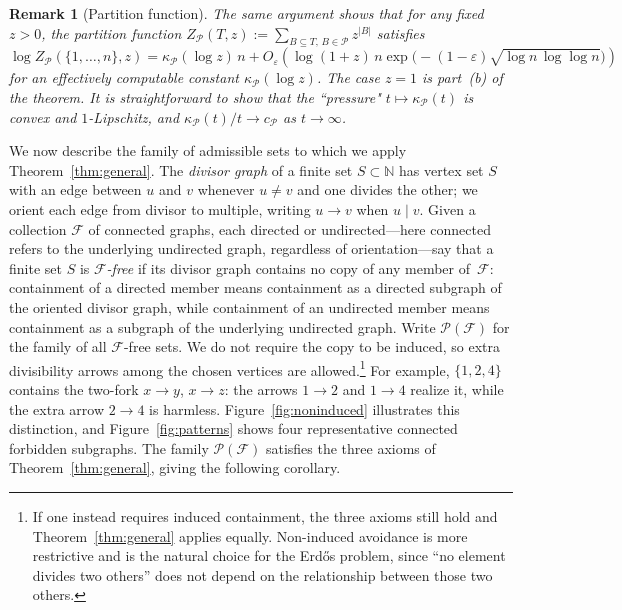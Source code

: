\documentclass[11pt]{amsart}
\newtheorem{remark}[theorem]{Remark}
\newcommand{\N}{\mathbb{N}}
\begin{document}
\begin{remark}[Partition function]\label{rem:partition}\rm
The same argument shows that for any fixed \(z>0\), the partition function \(Z_{\mathcal{P}}(T,z):=\sum_{B\subseteq T,\,B\in\mathcal{P}} z^{|B|}\) satisfies
\[
\log Z_{\mathcal{P}}(\{1,\dots,n\},z)
=\kappa_{\mathcal{P}}(\log z)\,n
+O_{\varepsilon}\!\left(
\log(1+z)\,n\exp\!\bigl(-(1-\varepsilon)\sqrt{\log n\,\log\log n}\bigr)
\right)
\]
for an effectively computable constant \(\kappa_{\mathcal{P}}(\log z)\). The case \(z=1\) is part~(b) of the theorem. It is straightforward to show that the ``pressure" \(t\mapsto\kappa_{\mathcal{P}}(t)\) is convex and \(1\)-Lipschitz, and \(\kappa_{\mathcal{P}}(t)/t\to c_{\mathcal{P}}\) as \(t\to\infty\).
\end{remark}

We now describe the family of admissible sets to which we apply Theorem~\ref{thm:general}. The \emph{divisor graph} of a finite set \(S\subset\N\) has vertex set \(S\) with an edge between \(u\) and \(v\) whenever \(u\ne v\) and one divides the other; we orient each edge from divisor to multiple, writing \(u\to v\) when \(u\mid v\). Given a collection \(\mathcal{F}\) of connected graphs, each directed or undirected---here connected refers to the underlying undirected graph, regardless of orientation---say that a finite set \(S\) is \emph{\(\mathcal{F}\)-free} if its divisor graph contains no copy of any member of~\(\mathcal{F}\): containment of a directed member means containment as a directed subgraph of the oriented divisor graph, while containment of an undirected member means containment as a subgraph of the underlying undirected graph. Write \(\mathcal{P}(\mathcal{F})\) for the family of all \(\mathcal{F}\)-free sets. We do not require the copy to be induced, so extra divisibility arrows among the chosen vertices are allowed.\footnote{If one instead requires induced containment, the three axioms still hold and Theorem~\ref{thm:general} applies equally. Non-induced avoidance is more restrictive and is the natural choice for the Erd\H{o}s problem, since ``no element divides two others'' does not depend on the relationship between those two others.} For example, \(\{1,2,4\}\) contains the two-fork \(x\to y\), \(x\to z\): the arrows \(1\to 2\) and \(1\to 4\) realize it, while the extra arrow \(2\to 4\) is harmless. Figure~\ref{fig:noninduced} illustrates this distinction, and Figure~\ref{fig:patterns} shows four representative connected forbidden subgraphs. The family \(\mathcal{P}(\mathcal{F})\) satisfies the three axioms of Theorem~\ref{thm:general}, giving the following corollary.
\end{document}
